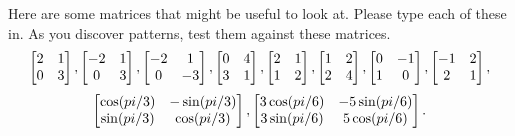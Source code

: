 \begin{problem}
Here are some matrices that might be useful to look at. Please type each of these in.  As you discover patterns, test them against these matrices. 
$$
\begin{bmatrix} 2&1\\0&3 \end{bmatrix},
\begin{bmatrix} -2&1\\0&3 \end{bmatrix},
\begin{bmatrix} -2&1\\0&-3 \end{bmatrix},
\begin{bmatrix} 0&4\\3&1 \end{bmatrix},
\begin{bmatrix} 2&1\\1&2 \end{bmatrix},
\begin{bmatrix} 1&2\\2&4 \end{bmatrix},
\begin{bmatrix} 0&-1\\1&0 \end{bmatrix},
\begin{bmatrix} -1&2\\2&1 \end{bmatrix},
$$
$$\begin{bmatrix} \cos(pi/3)&-\sin(pi/3)\\ \sin(pi/3)&\cos(pi/3) \end{bmatrix},
\begin{bmatrix} 3\cos(pi/6)&-5\sin(pi/6)\\ 3\sin(pi/6)&5\cos(pi/6) \end{bmatrix}.
$$
\end{problem}

















